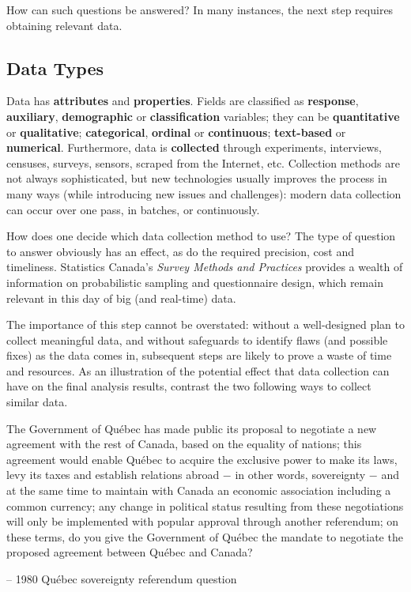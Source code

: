 \noindent How can such questions be answered? In many instances, the next step requires obtaining relevant data.   
\subsection{Data Types} 
Data has \textbf{attributes} and \textbf{properties}. Fields are classified as \textbf{response}, \textbf{auxiliary}, \textbf{demographic} or \textbf{classification} variables; they can be \textbf{quantitative} or \textbf{qualitative}; \textbf{categorical}, \textbf{ordinal} or \textbf{continuous}; \textbf{text-based} or \textbf{numerical}. Furthermore, data is \textbf{collected} through experiments, interviews, censuses, surveys, sensors, scraped from the Internet, etc. 
\newl  Collection methods are not always sophisticated, but new technologies usually improves the process in many ways (while introducing new issues and challenges): modern data collection can occur over one pass, in batches, or continuously.
\par How does one decide which data collection method to use? The type of question to answer obviously has an effect, as do the required precision, cost and timeliness. Statistics Canada's \textit{Survey Methods and Practices} \cite{DC_SC} provides a wealth of information on probabilistic sampling and questionnaire design, which remain relevant in this day of big (and real-time) data. \par The importance of this step cannot be overstated: without a well-designed plan to collect meaningful data, and without safeguards to identify flaws (and possible fixes) as the data comes in, subsequent steps are likely to prove a waste of time and resources. \newl
As an illustration of the potential effect that data collection can have on the final analysis results, contrast the two following ways to collect similar data.
\begin{tcolorbox}[title=Yes. I Mean No. ... I Think.]
The Government of Qu\'ebec has made public its proposal to negotiate a new agreement with the rest of Canada, based on the equality of nations; this agreement would enable Qu\'ebec to acquire the exclusive power to make its laws, levy its taxes and establish relations abroad $-$ in other words, sovereignty $-$ and at the same time to maintain with Canada an economic association including a common currency; any change in political status resulting from these negotiations will only be implemented with popular approval through another referendum; on these terms, do you give the Government of Qu\'ebec the mandate to negotiate the proposed agreement between Qu\'ebec and Canada? \\[-0.6cm]
\begin{flushright}
-- 1980 Qu\'ebec sovereignty referendum question
\end{flushright}
\end{tcolorbox}
